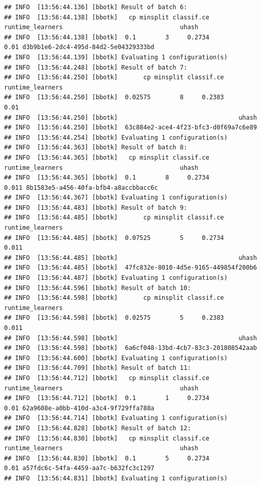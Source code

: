 \documentclass[
]{scrbook}
\begin{document}
\begin{verbatim}
## INFO  [13:56:44.136] [bbotk] Result of batch 6: 
## INFO  [13:56:44.138] [bbotk]   cp minsplit classif.ce runtime_learners                                uhash 
## INFO  [13:56:44.138] [bbotk]  0.1        3     0.2734             0.01 d3b9b1e6-2dc4-495d-84d2-5e04329333bd 
## INFO  [13:56:44.139] [bbotk] Evaluating 1 configuration(s) 
## INFO  [13:56:44.248] [bbotk] Result of batch 7: 
## INFO  [13:56:44.250] [bbotk]       cp minsplit classif.ce runtime_learners 
## INFO  [13:56:44.250] [bbotk]  0.02575        8     0.2383             0.01 
## INFO  [13:56:44.250] [bbotk]                                 uhash 
## INFO  [13:56:44.250] [bbotk]  63c884e2-ace4-4f23-bfc3-d0f69a7c6e89 
## INFO  [13:56:44.254] [bbotk] Evaluating 1 configuration(s) 
## INFO  [13:56:44.363] [bbotk] Result of batch 8: 
## INFO  [13:56:44.365] [bbotk]   cp minsplit classif.ce runtime_learners                                uhash 
## INFO  [13:56:44.365] [bbotk]  0.1        8     0.2734            0.011 8b1583e5-a456-40fa-bfb4-a8accbbacc6c 
## INFO  [13:56:44.367] [bbotk] Evaluating 1 configuration(s) 
## INFO  [13:56:44.483] [bbotk] Result of batch 9: 
## INFO  [13:56:44.485] [bbotk]       cp minsplit classif.ce runtime_learners 
## INFO  [13:56:44.485] [bbotk]  0.07525        5     0.2734            0.011 
## INFO  [13:56:44.485] [bbotk]                                 uhash 
## INFO  [13:56:44.485] [bbotk]  47fc832e-8010-4d5e-9165-449854f200b6 
## INFO  [13:56:44.487] [bbotk] Evaluating 1 configuration(s) 
## INFO  [13:56:44.596] [bbotk] Result of batch 10: 
## INFO  [13:56:44.598] [bbotk]       cp minsplit classif.ce runtime_learners 
## INFO  [13:56:44.598] [bbotk]  0.02575        5     0.2383            0.011 
## INFO  [13:56:44.598] [bbotk]                                 uhash 
## INFO  [13:56:44.598] [bbotk]  6a6cf048-13bd-4cb7-83c3-201808542aab 
## INFO  [13:56:44.600] [bbotk] Evaluating 1 configuration(s) 
## INFO  [13:56:44.709] [bbotk] Result of batch 11: 
## INFO  [13:56:44.712] [bbotk]   cp minsplit classif.ce runtime_learners                                uhash 
## INFO  [13:56:44.712] [bbotk]  0.1        1     0.2734             0.01 62a9608e-a0bb-410d-a3c4-9f729ffa788a 
## INFO  [13:56:44.714] [bbotk] Evaluating 1 configuration(s) 
## INFO  [13:56:44.828] [bbotk] Result of batch 12: 
## INFO  [13:56:44.830] [bbotk]   cp minsplit classif.ce runtime_learners                                uhash 
## INFO  [13:56:44.830] [bbotk]  0.1        5     0.2734             0.01 a57fdc6c-54fa-4459-aa7c-b632fc3c1297 
## INFO  [13:56:44.831] [bbotk] Evaluating 1 configuration(s) 

\end{verbatim}
\end{document}

